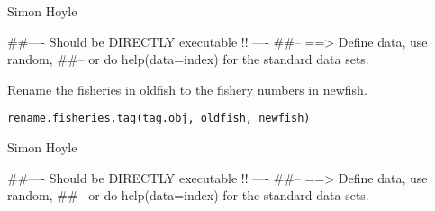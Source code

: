 \documentclass[a4paper]{book}
\begin{document}
%
\begin{Author}\relax

Simon Hoyle
\end{Author}
%
\begin{Examples}
\begin{ExampleCode}
##---- Should be DIRECTLY executable !! ----
##-- ==>  Define data, use random,
##--	or do  help(data=index)  for the standard data sets.

\end{ExampleCode}
\end{Examples}
%
\begin{Description}\relax

Rename the fisheries in oldfish to the fishery numbers in newfish. 
\end{Description}
%
\begin{Usage}
\begin{verbatim}
rename.fisheries.tag(tag.obj, oldfish, newfish)
\end{verbatim}
\end{Usage}
%
\begin{Arguments}
\begin{ldescription}
\item[\code{tag.obj}] 


\item[\code{oldfish}] 


\item[\code{newfish}] 


\end{ldescription}
\end{Arguments}
%
\begin{Author}\relax

Simon Hoyle
\end{Author}
%
\begin{Examples}
\begin{ExampleCode}
##---- Should be DIRECTLY executable !! ----
##-- ==>  Define data, use random,
##--	or do  help(data=index)  for the standard data sets.

\end{ExampleCode}
\end{Examples}
\end{document}
